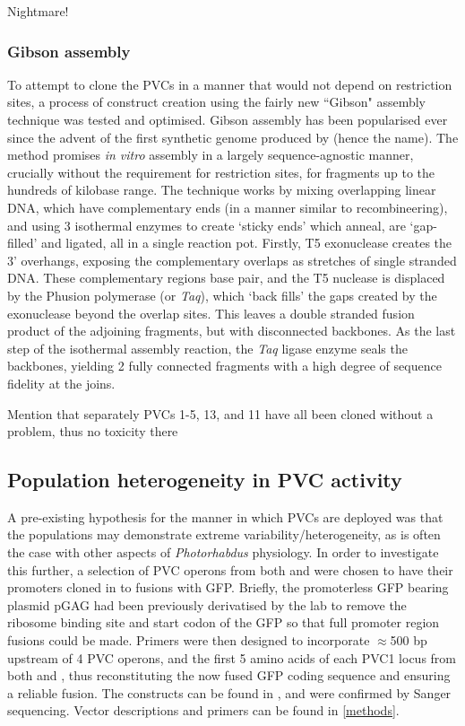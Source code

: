 
Nightmare!


\subsubsection{Gibson assembly}
To attempt to clone the PVCs in a manner that would not depend on restriction sites, a process of construct creation using the fairly new ``Gibson" assembly technique was tested and optimised. Gibson assembly has been popularised ever since the advent of the first synthetic genome produced by \cite{Gibson2010c, Gibson2009a} (hence the name). The method promises \emph{in vitro} assembly in a largely sequence-agnostic manner, crucially without the requirement for restriction sites, for fragments up to the hundreds of kilobase range. The technique works by mixing overlapping linear DNA, which have complementary ends (in a manner similar to recombineering), and using 3 isothermal enzymes to create `sticky ends' which anneal, are `gap-filled' and ligated, all in a single reaction pot. Firstly, T5 exonuclease creates the 3' overhangs, exposing the complementary overlaps as stretches of single stranded DNA. These complementary regions base pair, and the T5 nuclease is displaced by the Phusion polymerase (or \emph{Taq}), which `back fills' the gaps created by the exonuclease beyond the overlap sites. This leaves a double stranded fusion product of the adjoining fragments, but with disconnected backbones. As the last step of the isothermal assembly reaction, the \emph{Taq} ligase enzyme seals the backbones, yielding 2 fully connected fragments with a high degree of sequence fidelity at the joins.



Mention that separately PVCs 1-5, 13, and 11 have all been cloned without a problem, thus no toxicity there



\subsection{Population heterogeneity in PVC activity}
A pre-existing hypothesis for the manner in which PVCs are deployed was that the populations may demonstrate extreme variability/heterogeneity, as is often the case with other aspects of \emph{Photorhabdus} physiology. In order to investigate this further, a selection of PVC operons from both \Plum{} and \Pasy{} were chosen to have their promoters cloned in to fusions with GFP. Briefly, the promoterless GFP bearing plasmid pGAG had been previously derivatised by the lab to remove the ribosome binding site and start codon of the GFP so that full promoter region fusions could be made. Primers were then designed to incorporate $\approx$500 bp upstream of 4 PVC operons, and the first 5 amino acids of each PVC1 locus from both \Plum{} and \Pasy, thus reconstituting the now fused GFP coding sequence and ensuring a reliable fusion. The constructs can be found in , and were confirmed by Sanger sequencing. Vector descriptions and primers can be found in \vref{methods}.

